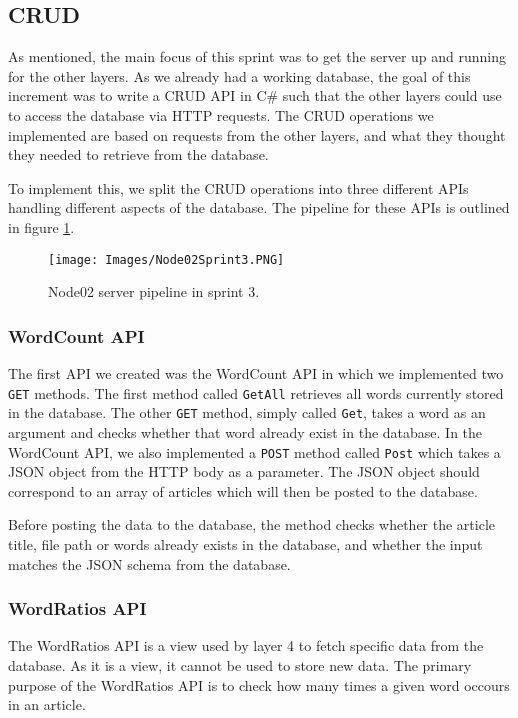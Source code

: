 \subsection{CRUD}

As mentioned, the main focus of this sprint was to get the server up and running for the other layers. 
As we already had a working database, the goal of this increment was to write a CRUD API in C\# such that the other layers could use to access the database via HTTP requests.
The CRUD operations we implemented are based on requests from the other layers, and what they thought they needed to retrieve from the database.

To implement this, we split the CRUD operations into three different APIs handling different aspects of the database. 
The pipeline for these APIs is outlined in figure \ref{Node02Sprint3}.

\begin{figure}[h]
    \centering
    \texttt{[image: Images/Node02Sprint3.PNG]}
    \caption{Node02 server pipeline in sprint 3.}
    \label{Node02Sprint3}
\end{figure}

\subsubsection{WordCount API}
The first API we created was the WordCount API in which we implemented two \texttt{GET} methods.
The first method called \texttt{GetAll} retrieves all words currently stored in the database.
The other \texttt{GET} method, simply called \texttt{Get}, takes a word as an argument and checks whether that word already exist in the database.
In the WordCount API, we also implemented a \texttt{POST} method called \texttt{Post} which takes a JSON object from the HTTP body as a parameter. 
The JSON object should correspond to an array of articles which will then be posted to the database. 

Before posting the data to the database, the method checks whether the article title, file path or words already exists in the database, and whether the input matches the JSON schema from the database.


\subsubsection{WordRatios API}
The WordRatios API is a view used by layer 4 to fetch specific data from the database.
As it is a view, it cannot be used to store new data. 
The primary purpose of the WordRatios API is to check how many times a given word occours in an article.


